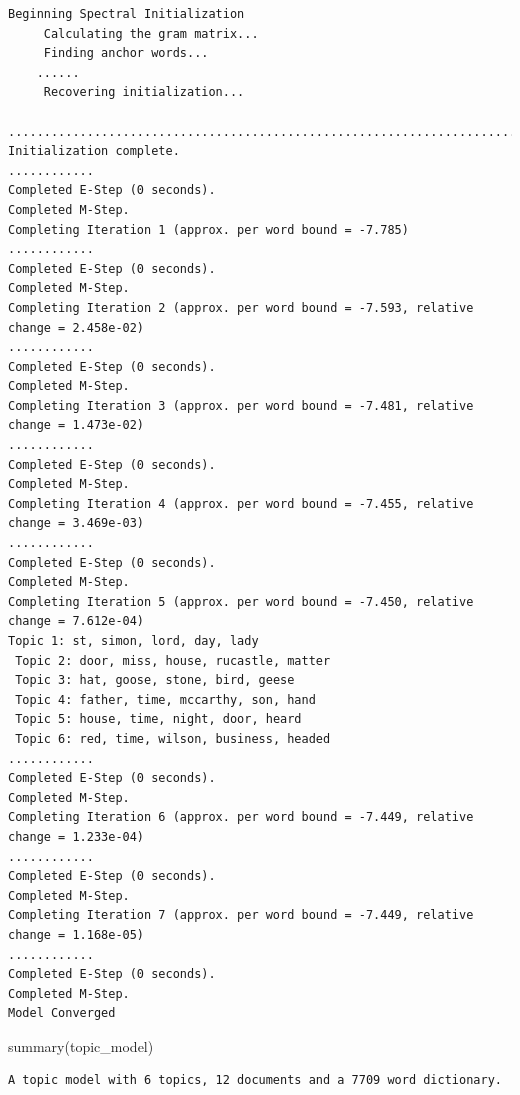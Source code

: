 \documentclass[
  letterpaper,
  DIV=11,
  numbers=noendperiod]{scrreprt}
\newenvironment{Shaded}{\begin{snugshade}}{\end{snugshade}}
\newcommand{\FunctionTok}[1]{\textcolor[rgb]{0.28,0.35,0.67}{#1}}
\newcommand{\NormalTok}[1]{\textcolor[rgb]{0.00,0.23,0.31}{#1}}
\begin{document}
\begin{verbatim}
Beginning Spectral Initialization 
     Calculating the gram matrix...
     Finding anchor words...
    ......
     Recovering initialization...
    .............................................................................
Initialization complete.
............
Completed E-Step (0 seconds). 
Completed M-Step. 
Completing Iteration 1 (approx. per word bound = -7.785) 
............
Completed E-Step (0 seconds). 
Completed M-Step. 
Completing Iteration 2 (approx. per word bound = -7.593, relative change = 2.458e-02) 
............
Completed E-Step (0 seconds). 
Completed M-Step. 
Completing Iteration 3 (approx. per word bound = -7.481, relative change = 1.473e-02) 
............
Completed E-Step (0 seconds). 
Completed M-Step. 
Completing Iteration 4 (approx. per word bound = -7.455, relative change = 3.469e-03) 
............
Completed E-Step (0 seconds). 
Completed M-Step. 
Completing Iteration 5 (approx. per word bound = -7.450, relative change = 7.612e-04) 
Topic 1: st, simon, lord, day, lady 
 Topic 2: door, miss, house, rucastle, matter 
 Topic 3: hat, goose, stone, bird, geese 
 Topic 4: father, time, mccarthy, son, hand 
 Topic 5: house, time, night, door, heard 
 Topic 6: red, time, wilson, business, headed 
............
Completed E-Step (0 seconds). 
Completed M-Step. 
Completing Iteration 6 (approx. per word bound = -7.449, relative change = 1.233e-04) 
............
Completed E-Step (0 seconds). 
Completed M-Step. 
Completing Iteration 7 (approx. per word bound = -7.449, relative change = 1.168e-05) 
............
Completed E-Step (0 seconds). 
Completed M-Step. 
Model Converged 
\end{verbatim}

\begin{Shaded}
\begin{Highlighting}[]
\FunctionTok{summary}\NormalTok{(topic\_model)}
\end{Highlighting}
\end{Shaded}

\begin{verbatim}
A topic model with 6 topics, 12 documents and a 7709 word dictionary.
\end{verbatim}
\end{document}
